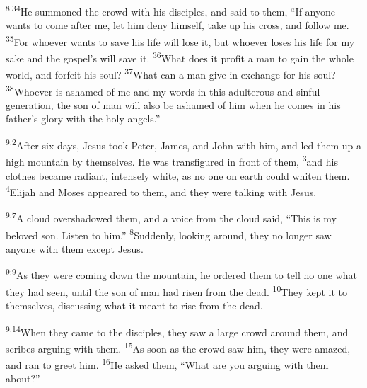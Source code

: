 \documentclass[openany,12pt,english]{book}
\newenvironment{para}{\par\pretolerance=100\tolerance=200\setlength{\emergencystretch}{0.6em}\relax}{\par}
\begin{document}
\begin{para}
    \textsuperscript{8:34}\thinspace{}He summoned the crowd with his disciples, and said to them, “If any\-one wants to come af\-ter me, let him de\-ny him\-self, take up his cross, and fol\-low me.
    \textsuperscript{35}\thinspace{}For who\-ev\-er wants to save his life will lose it, but who\-ev\-er loses his life for my sa\-ke and the gospel's will save it.
    \textsuperscript{36}\thinspace{}What does it prof\-it a man to gain the whole world, and for\-feit his soul?
    \textsuperscript{37}\thinspace{}What can a man give in ex\-change for his soul?
    \textsuperscript{38}\thinspace{}Who\-ev\-er is a\-shamed of me and my words in this a\-dul\-ter\-ous and sin\-ful gen\-er\-a\-tion, the son of man will al\-so be a\-shamed of him when he co\-mes in his father's glo\-ry with the ho\-ly angels.”
\end{para}

\bigskip{}

\begin{para}
    \textsuperscript{9:2}\thinspace{}Af\-ter six days, Jesus took Pe\-ter, James, and John with him, and led them up a high moun\-tain by them\-selves. He was transfigured in front of them,
    \textsuperscript{3}\thinspace{}and his clothes be\-came ra\-di\-ant, in\-tense\-ly white, as no one on earth could whit\-en them.
    \textsuperscript{4}\thinspace{}Elijah and Mo\-ses appeared to them, and they were talking with Jesus.
\end{para}

\begin{para}
    \textsuperscript{9:7}\thinspace{}A cloud overshadowed them, and a voice from the cloud said, “This is my be\-lov\-ed son. Lis\-ten to him.”
    \textsuperscript{8}\thinspace{}Sud\-den\-ly, looking a\-round, they no long\-er saw any\-one with them ex\-cept Jesus.
\end{para}

\begin{para}
    \textsuperscript{9:9}\thinspace{}As they were com\-ing down the moun\-tain, he ordered them to tell no one what they had seen, un\-til the son of man had ris\-en from the dead.
    \textsuperscript{10}\thinspace{}They kept it to them\-selves, discussing what it meant to rise from the dead.
\end{para}

\bigskip{}

\begin{para}
    \textsuperscript{9:14}\thinspace{}When they came to the disciples, they saw a large crowd a\-round them, and scribes ar\-gu\-ing with them.
    \textsuperscript{15}\thinspace{}As soon as the crowd saw him, they were a\-mazed, and ran to greet him.
    \textsuperscript{16}\thinspace{}He asked them, “What are you ar\-gu\-ing with them a\-bout?”
\end{para}
\end{document}
